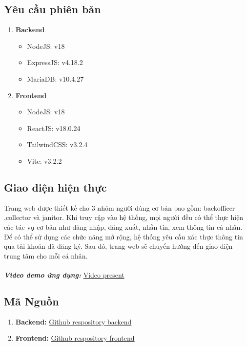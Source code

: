     \subsection{Yêu cầu phiên bản}
        \begin{enumerate}
            \item \textbf{Backend}
            \begin{itemize}
                \item NodeJS: v18
                \item ExpressJS: v4.18.2
                \item MariaDB: v10.4.27
            \end{itemize}
            \item \textbf{Frontend}
            \begin{itemize}
                \item NodeJS: v18
                \item ReactJS: v18.0.24
                \item TailwindCSS: v3.2.4
                \item Vite: v3.2.2
            \end{itemize}
        \end{enumerate}    

    \subsection{Giao diện hiện thực}
        \quad Trang web được thiết kế cho 3 nhóm người dùng cơ bản bao gồm: backofficer ,collector và janitor. Khi truy cập vào hệ thống, mọi người đều có thể thực hiện các tác vụ cơ bản như đăng nhập, đăng xuất, nhắn tin, xem thông tin cá nhân.\\

        \quad Để có thể sử dụng các chức năng mở rộng, hệ thống yêu cầu xác thực thông tin qua tài khoản đã đăng ký. Sau đó, trang web sẽ chuyển hướng đến giao diện trung tâm cho mỗi cá nhân. \\ \\
        \textbf{\textit{Video demo ứng dụng: }}
        \href{https://drive.google.com/file/d/1Ua2RockEShpA551Xof8fn6BTckJMNLml/view?usp=share_link}{Video present}


    \subsection{Mã Nguồn}
        \begin{enumerate}
            \item \textbf{Backend:}
            \href{https://github.com/thoaikun/Urban-Waste-Collection-2.0}{Github respository backend}
            \item \textbf{Frontend:}
            \href{https://github.com/smartkiiwii/Urban-Waste-Collection-2.0-Front-End}{Github respository frontend}
        \end{enumerate}
            
